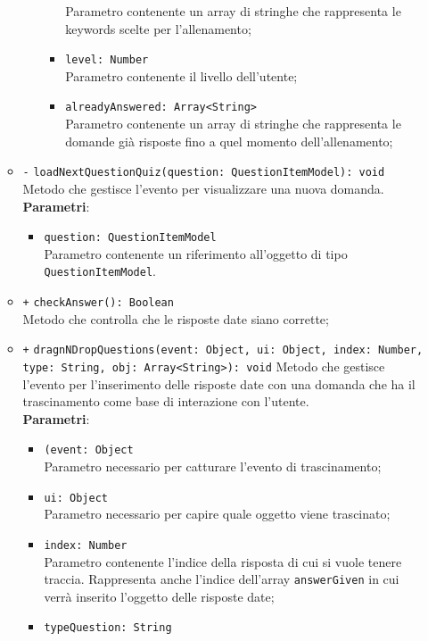 \begin{itemize}
\begin{itemize}
\begin{itemize}
\begin{itemize}
				Parametro contenente un array di stringhe che rappresenta le keywords scelte per l'allenamento;
				\item \texttt{level: Number} \\
				Parametro contenente il livello dell'utente;
				\item \texttt{alreadyAnswered: Array<String>} \\
				Parametro contenente un array di stringhe che rappresenta le domande già risposte fino a quel momento dell'allenamento;
			\end{itemize}
		\end{itemize}
		\item \texttt{-} \texttt{loadNextQuestionQuiz(question: QuestionItemModel): void} \\
		Metodo che gestisce l'evento per visualizzare una nuova domanda. \\
		\textbf{Parametri}:
		\begin{itemize}
			\item \texttt{question: QuestionItemModel} \\
			Parametro contenente un riferimento all'oggetto di tipo \texttt{QuestionItemModel}.
		\end{itemize}
		\item \texttt{+} \texttt{checkAnswer(): Boolean} \\ 
		Metodo che controlla che le risposte date siano corrette;
		\item \texttt{+} \texttt{dragnNDropQuestions(event: Object, ui: Object, index: Number, type: String, obj: Array<String>): void} 
		Metodo che gestisce l'evento per l'inserimento delle risposte date con una domanda che ha il trascinamento come base di interazione con l'utente. \\
		\textbf{Parametri}:
		\begin{itemize}
			\item \texttt{(event: Object} \\
			Parametro necessario per catturare l'evento di trascinamento;
			\item \texttt{ui: Object} \\
			Parametro necessario per capire quale oggetto viene trascinato;
			\item \texttt{index: Number} \\
			Parametro contenente l'indice della risposta di cui si vuole tenere traccia. Rappresenta anche l'indice dell'array \texttt{answerGiven} in cui verrà inserito l'oggetto delle risposte date;
			\item \texttt{typeQuestion: String} \\

\end{itemize}
\end{itemize}
\end{itemize}
